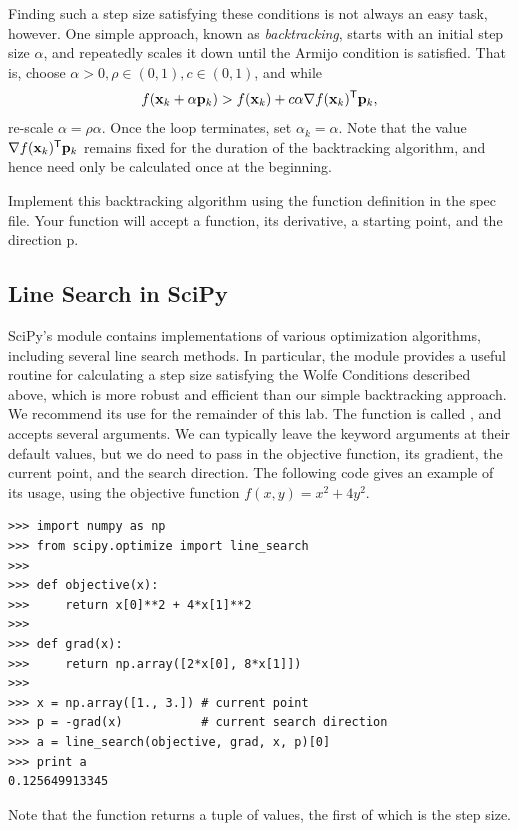 Finding such a step size satisfying these conditions is not always an easy task, however.
One simple approach, known as \emph{backtracking}, starts with an initial step size $\alpha$, and repeatedly scales it down until the Armijo condition is satisfied.
That is, choose $\alpha >0, \rho \in (0, 1), c\in (0, 1)$, and while
\[f(\mathbf{x}_k + \alpha \mathbf{p}_k) > f(\mathbf{x}_k) + c\alpha\nabla f(\mathbf{x}_k)^{\mathsf T} \mathbf{p}_k,\]
re-scale $\alpha = \rho\alpha$.
Once the loop terminates, set $\alpha_k = \alpha$.
Note that the value $\nabla f(\mathbf{x}_k)^{\mathsf T} \mathbf{p}_k$ remains fixed for the duration of the backtracking algorithm, and hence need only be calculated once at the beginning.

\begin{problem} %
Implement this backtracking algorithm using the function definition in the spec file.
Your function will accept a function, its derivative, a starting point, and the direction p.
\end{problem}


\subsection*{Line Search in SciPy} %

SciPy's  module contains implementations of various optimization algorithms, including several line search methods.
In particular, the module provides a useful routine for calculating a step size satisfying the Wolfe Conditions described above, which is more robust and efficient than our simple backtracking approach.
We recommend its use for the remainder of this lab.
The function is called , and accepts several arguments.
We can typically leave the keyword arguments at their default values, but we do need to pass in the objective function, its gradient, the current point, and the search direction.
The following code gives an example of its usage, using the objective function $f(x, y) = x^2+4y^2$.

\begin{lstlisting}
>>> import numpy as np
>>> from scipy.optimize import line_search
>>>
>>> def objective(x):
>>>     return x[0]**2 + 4*x[1]**2
>>>
>>> def grad(x):
>>>     return np.array([2*x[0], 8*x[1]])
>>>
>>> x = np.array([1., 3.]) # current point
>>> p = -grad(x)           # current search direction
>>> a = line_search(objective, grad, x, p)[0]
>>> print a
0.125649913345
\end{lstlisting}

Note that the function returns a tuple of values, the first of which is the step size.


